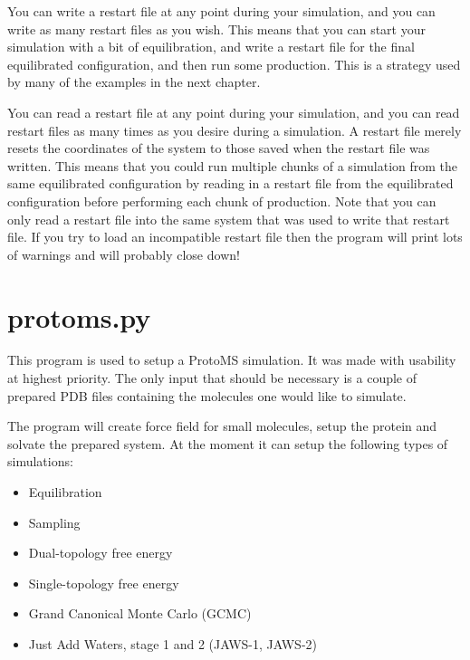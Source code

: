\documentclass[letterpaper,10pt,english]{sphinxmanual}
\begin{document}
You can write a restart file at any point during your simulation, and you can write as many restart files as you wish. This means that you can start your simulation with a bit of equilibration, and write a restart file for the final equilibrated configuration, and then run some production. This is a strategy used by many of the examples in the next chapter.

You can read a restart file at any point during your simulation, and you can read restart files as many times as you desire during a simulation. A restart file merely resets the coordinates of the system to those saved when the restart file was written. This means that you could run multiple chunks of a simulation from the same equilibrated configuration by reading in a restart file from the equilibrated configuration before performing each chunk of production. Note that you can only read a restart file into the same system that was used to write that restart file. If you try to load an incompatible restart file then the program will print lots of warnings and will probably close down!


\chapter{protoms.py}
\label{protomspy:protoms-py}\label{protomspy::doc}
This program is used to setup a ProtoMS simulation. It was made with usability at highest priority. The only input that should be necessary is a couple of prepared PDB files containing the molecules one would like to simulate.

The program will create force field for small molecules, setup the protein and solvate the prepared system. At the moment it can setup the following types of simulations:
\begin{itemize}
\item {} 
Equilibration

\item {} 
Sampling

\item {} 
Dual-topology free energy

\item {} 
Single-topology free energy

\item {} 
Grand Canonical Monte Carlo (GCMC)

\item {} 
Just Add Waters, stage 1 and 2 (JAWS-1, JAWS-2)

\end{itemize}
\end{document}
